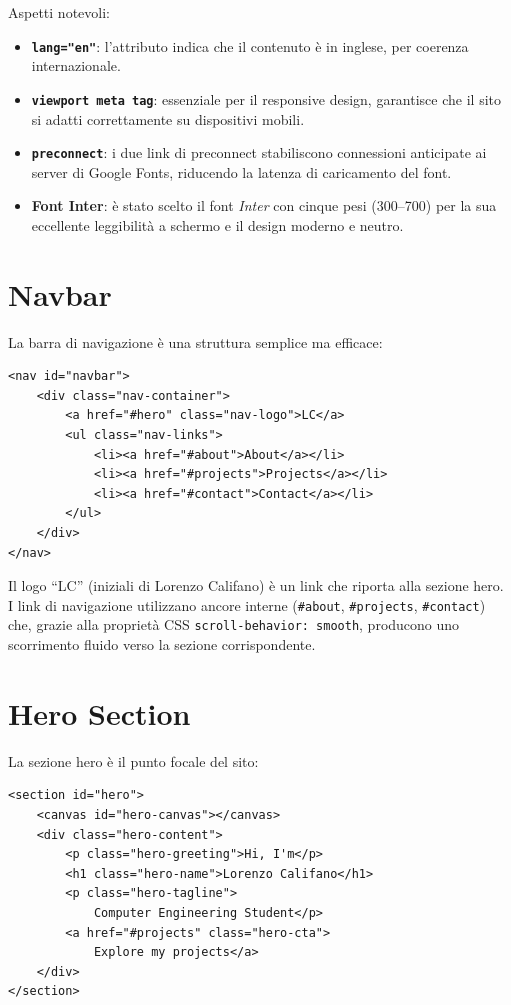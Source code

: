 \documentclass[a4paper,12pt]{report}
\begin{document}
Aspetti notevoli:

\begin{itemize}[leftmargin=2cm]
    \item \textbf{\texttt{lang="en"}}: l'attributo indica che il contenuto \`e in inglese, per coerenza internazionale.
    \item \textbf{\texttt{viewport meta tag}}: essenziale per il responsive design, garantisce che il sito si adatti correttamente su dispositivi mobili.
    \item \textbf{\texttt{preconnect}}: i due link di preconnect stabiliscono connessioni anticipate ai server di Google Fonts, riducendo la latenza di caricamento del font.
    \item \textbf{Font Inter}: \`e stato scelto il font \textit{Inter} con cinque pesi (300--700) per la sua eccellente leggibilit\`a a schermo e il design moderno e neutro.
\end{itemize}

\section{Navbar}

La barra di navigazione \`e una struttura semplice ma efficace:

\begin{lstlisting}[style=htmlstyle, caption={Struttura della Navbar}]
<nav id="navbar">
    <div class="nav-container">
        <a href="#hero" class="nav-logo">LC</a>
        <ul class="nav-links">
            <li><a href="#about">About</a></li>
            <li><a href="#projects">Projects</a></li>
            <li><a href="#contact">Contact</a></li>
        </ul>
    </div>
</nav>
\end{lstlisting}

Il logo ``LC'' (iniziali di Lorenzo Califano) \`e un link che riporta alla sezione hero. I link di navigazione utilizzano ancore interne (\texttt{\#about}, \texttt{\#projects}, \texttt{\#contact}) che, grazie alla propriet\`a CSS \texttt{scroll-behavior: smooth}, producono uno scorrimento fluido verso la sezione corrispondente.

\section{Hero Section}

La sezione hero \`e il punto focale del sito:

\begin{lstlisting}[style=htmlstyle, caption={Struttura dell'Hero}]
<section id="hero">
    <canvas id="hero-canvas"></canvas>
    <div class="hero-content">
        <p class="hero-greeting">Hi, I'm</p>
        <h1 class="hero-name">Lorenzo Califano</h1>
        <p class="hero-tagline">
            Computer Engineering Student</p>
        <a href="#projects" class="hero-cta">
            Explore my projects</a>
    </div>
</section>
\end{lstlisting}
\end{document}
